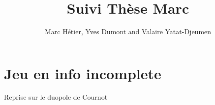 \documentclass{article}
\title{Suivi Thèse Marc}
\author{Marc Hétier, Yves Dumont  and Valaire Yatat-Djeumen}
\begin{document}
\maketitle

\section{Jeu en info incomplete}
Reprise sur le duopole de Cournot
\end{document}
